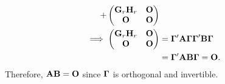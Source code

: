 \begin{Lemma}{}{}
\begin{align*}
        +\begin{pmatrix}
             \mathbf{G}_r \mathbf{H}_r & \mathbf{O} \\
             \mathbf{O}                & \mathbf{O}
         \end{pmatrix}                                                               \\
        \implies
        \begin{pmatrix}
            \mathbf{G}_r \mathbf{H}_r & \mathbf{O} \\
            \mathbf{O}                & \mathbf{O}
        \end{pmatrix}
         & =\mathbf{\Gamma}'\mathbf{A\Gamma \Gamma}'\mathbf{B}\mathbf{\Gamma}                                 \\
         & =\mathbf{\Gamma}'\mathbf{AB \Gamma}=\mathbf{O}.
    \end{align*}
    Therefore, $ \mathbf{AB}=\mathbf{O} $ since $ \mathbf{\Gamma} $ is orthogonal and invertible.
\end{Lemma}

